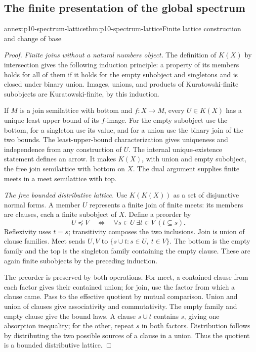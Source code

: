 \subsection{The finite presentation of the global spectrum}
\label{sec:annex-p10-corrected-global-spectrum}

\begin{annexitem}{annex:p10-spectrum-lattice}{thm:p10-spectrum-lattice}{Finite lattice construction and change of base}
\begin{proof}
\emph{Finite joins without a natural numbers object.}
The definition of \(K(X)\) by intersection gives the following induction
principle: a property of its members holds for all of them if it holds
for the empty subobject and singletons and is closed under binary union.
Images, unions, and products of Kuratowski-finite subobjects are
Kuratowski-finite, by this induction.

If \(M\) is a join semilattice with bottom and \(f:X\to M\),
every \(U\in K(X)\) has a unique least upper bound of its \(f\)-image.
For the empty subobject use the bottom, for a singleton use its value,
and for a union use the binary join of the two bounds.
The least-upper-bound characterization gives uniqueness and independence
from any construction of \(U\).
The internal unique-existence statement defines an arrow.
It makes \(K(X)\), with union and empty subobject, the free
join semilattice with bottom on \(X\).
The dual argument supplies finite meets in a meet semilattice with top.

\emph{The free bounded distributive lattice.}
Use \(K(K(X))\) as a set of disjunctive normal forms.
A member \(U\) represents a finite join of finite meets:
its members are clauses, each a finite subobject of \(X\).
Define a preorder by
\[
 U\preceq V
 \quad\Longleftrightarrow\quad
 \forall s\in U\ \exists t\in V\ (t\subseteq s).
\]
Reflexivity uses \(t=s\); transitivity composes the two inclusions.
Join is union of clause families. Meet sends \(U,V\) to
\(\{s\cup t:s\in U,\ t\in V\}\).
The bottom is the empty family and the top is the singleton
family containing the empty clause.
These are again finite subobjects by the preceding induction.

The preorder is preserved by both operations. For meet, a contained
clause from each factor gives their contained union; for join,
use the factor from which a clause came.
Pass to the effective quotient by mutual comparison.
Union and union of clauses give associativity and commutativity.
The empty family and empty clause give the bound laws.
A clause \(s\cup t\) contains \(s\), giving one absorption
inequality; for the other, repeat \(s\) in both factors.
Distribution follows by distributing the two possible sources of
a clause in a union. Thus the quotient is a bounded distributive lattice.


\end{proof}
\end{annexitem}
